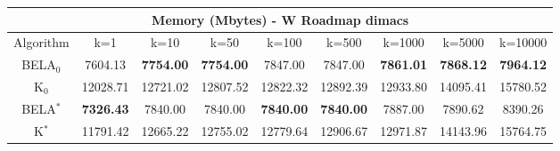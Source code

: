\begin{tabular}{c|cccccccc}\toprule
\multicolumn{9}{c}{Memory (Mbytes) - W Roadmap dimacs}\\ \midrule
Algorithm & k=1 & k=10 & k=50 & k=100 & k=500 & k=1000 & k=5000 & k=10000 \\ \midrule
BELA$_0$ & 7604.13 & \textbf{7754.00} & \textbf{7754.00} & 7847.00 & 7847.00 & \textbf{7861.01} & \textbf{7868.12} & \textbf{7964.12} \\
K$_0$ & 12028.71 & 12721.02 & 12807.52 & 12822.32 & 12892.39 & 12933.80 & 14095.41 & 15780.52 \\
BELA$^*$ & \textbf{7326.43} & 7840.00 & 7840.00 & \textbf{7840.00} & \textbf{7840.00} & 7887.00 & 7890.62 & 8390.26 \\
K$^*$ & 11791.42 & 12665.22 & 12755.02 & 12779.64 & 12906.67 & 12971.87 & 14143.96 & 15764.75 \\ \bottomrule 
\end{tabular}
